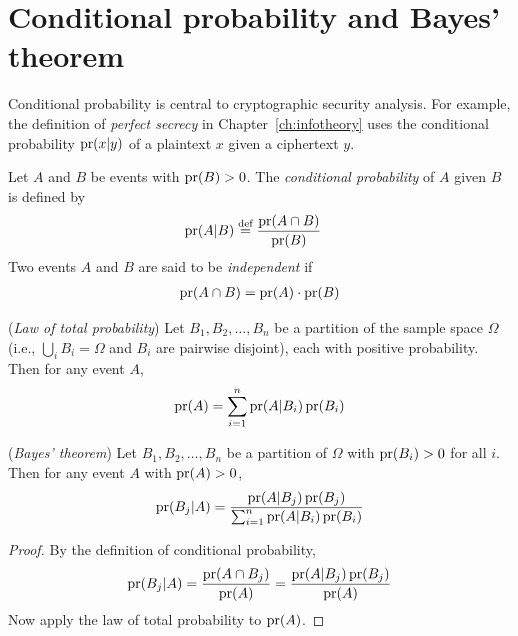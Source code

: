 \documentclass[a4paper, 12pt]{book} %
\begin{document}
\section{Conditional probability and Bayes' theorem}

Conditional probability is central to cryptographic security analysis. For
example, the definition of \emph{perfect secrecy} in Chapter~\ref{ch:infotheory}
uses the conditional probability $\operatorname{pr}(x|y)$ of a plaintext $x$ given a ciphertext $y$.

\begin{definition}
    Let $A$ and $B$ be events with $\operatorname{pr}(B) > 0$. The \emph{conditional probability} of $A$ given $B$ is defined by
    \begin{align}
        \operatorname{pr}(A | B) &\overset{\text{def}}{=} \frac{\operatorname{pr}(A \cap B)}{\operatorname{pr}(B)}
    \end{align}
    Two events $A$ and $B$ are said to be \emph{independent} if
    \begin{align}
        \operatorname{pr}(A \cap B) = \operatorname{pr}(A) \cdot \operatorname{pr}(B)
    \end{align}
\end{definition}

\begin{proposition}
    (\emph{Law of total probability}) Let $B_1, B_2, \ldots, B_n$ be a partition of the sample space $\Omega$ (i.e., $\bigcup_i B_i = \Omega$ and $B_i$ are pairwise disjoint), each with positive probability. Then for any event $A$,
    \begin{align}
        \operatorname{pr}(A) = \sum_{i=1}^{n} \operatorname{pr}(A | B_i) \operatorname{pr}(B_i)
    \end{align}
\end{proposition}

\begin{theorem}
    (\emph{Bayes' theorem}) Let $B_1, B_2, \ldots, B_n$ be a partition of $\Omega$ with $\operatorname{pr}(B_i) > 0$ for all $i$. Then for any event $A$ with $\operatorname{pr}(A) > 0$,
    \begin{align}
        \operatorname{pr}(B_j | A) = \frac{\operatorname{pr}(A | B_j) \operatorname{pr}(B_j)}{\sum_{i=1}^{n} \operatorname{pr}(A | B_i) \operatorname{pr}(B_i)}
    \end{align}
\end{theorem}

\begin{proof}
    By the definition of conditional probability,
    \begin{align}
        \operatorname{pr}(B_j | A) = \frac{\operatorname{pr}(A \cap B_j)}{\operatorname{pr}(A)} = \frac{\operatorname{pr}(A | B_j) \operatorname{pr}(B_j)}{\operatorname{pr}(A)}
    \end{align}
    Now apply the law of total probability to $\operatorname{pr}(A)$.
\end{proof}
\end{document}
